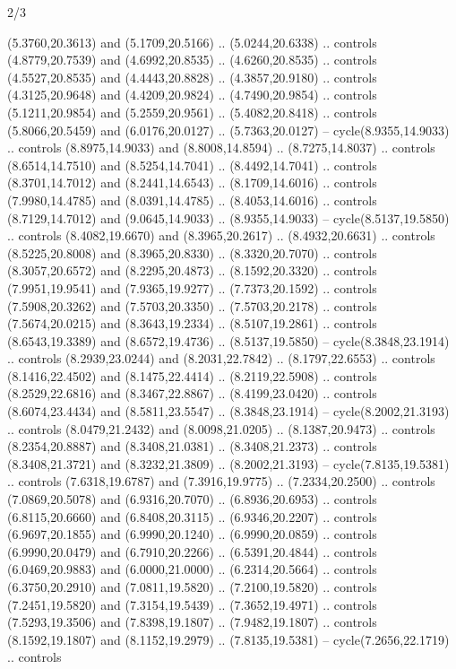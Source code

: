 \begin{flagdescription}{2/3}
\begin{scope}[yshift=\flagwidth,scale=\flagwidth/1241.93737]
\begin{scope}[y=-1mm, x=1mm,draw=gold,fill=blue,line join=miter,miter limit=4,line width=1.8\lw]
{  (5.3760,20.3613) and (5.1709,20.5166) .. (5.0244,20.6338) .. controls
  (4.8779,20.7539) and (4.6992,20.8535) .. (4.6260,20.8535) .. controls
  (4.5527,20.8535) and (4.4443,20.8828) .. (4.3857,20.9180) .. controls
  (4.3125,20.9648) and (4.4209,20.9824) .. (4.7490,20.9854) .. controls
  (5.1211,20.9854) and (5.2559,20.9561) .. (5.4082,20.8418) .. controls
  (5.8066,20.5459) and (6.0176,20.0127) .. (5.7363,20.0127) --
  cycle(8.9355,14.9033) .. controls (8.8975,14.9033) and (8.8008,14.8594) ..
  (8.7275,14.8037) .. controls (8.6514,14.7510) and (8.5254,14.7041) ..
  (8.4492,14.7041) .. controls (8.3701,14.7012) and (8.2441,14.6543) ..
  (8.1709,14.6016) .. controls (7.9980,14.4785) and (8.0391,14.4785) ..
  (8.4053,14.6016) .. controls (8.7129,14.7012) and (9.0645,14.9033) ..
  (8.9355,14.9033) -- cycle(8.5137,19.5850) .. controls (8.4082,19.6670) and
  (8.3965,20.2617) .. (8.4932,20.6631) .. controls (8.5225,20.8008) and
  (8.3965,20.8330) .. (8.3320,20.7070) .. controls (8.3057,20.6572) and
  (8.2295,20.4873) .. (8.1592,20.3320) .. controls (7.9951,19.9541) and
  (7.9365,19.9277) .. (7.7373,20.1592) .. controls (7.5908,20.3262) and
  (7.5703,20.3350) .. (7.5703,20.2178) .. controls (7.5674,20.0215) and
  (8.3643,19.2334) .. (8.5107,19.2861) .. controls (8.6543,19.3389) and
  (8.6572,19.4736) .. (8.5137,19.5850) -- cycle(8.3848,23.1914) .. controls
  (8.2939,23.0244) and (8.2031,22.7842) .. (8.1797,22.6553) .. controls
  (8.1416,22.4502) and (8.1475,22.4414) .. (8.2119,22.5908) .. controls
  (8.2529,22.6816) and (8.3467,22.8867) .. (8.4199,23.0420) .. controls
  (8.6074,23.4434) and (8.5811,23.5547) .. (8.3848,23.1914) --
  cycle(8.2002,21.3193) .. controls (8.0479,21.2432) and (8.0098,21.0205) ..
  (8.1387,20.9473) .. controls (8.2354,20.8887) and (8.3408,21.0381) ..
  (8.3408,21.2373) .. controls (8.3408,21.3721) and (8.3232,21.3809) ..
  (8.2002,21.3193) -- cycle(7.8135,19.5381) .. controls (7.6318,19.6787) and
  (7.3916,19.9775) .. (7.2334,20.2500) .. controls (7.0869,20.5078) and
  (6.9316,20.7070) .. (6.8936,20.6953) .. controls (6.8115,20.6660) and
  (6.8408,20.3115) .. (6.9346,20.2207) .. controls (6.9697,20.1855) and
  (6.9990,20.1240) .. (6.9990,20.0859) .. controls (6.9990,20.0479) and
  (6.7910,20.2266) .. (6.5391,20.4844) .. controls (6.0469,20.9883) and
  (6.0000,21.0000) .. (6.2314,20.5664) .. controls (6.3750,20.2910) and
  (7.0811,19.5820) .. (7.2100,19.5820) .. controls (7.2451,19.5820) and
  (7.3154,19.5439) .. (7.3652,19.4971) .. controls (7.5293,19.3506) and
  (7.8398,19.1807) .. (7.9482,19.1807) .. controls (8.1592,19.1807) and
  (8.1152,19.2979) .. (7.8135,19.5381) -- cycle(7.2656,22.1719) .. controls
}
\end{scope}
\end{scope}
\end{flagdescription}
